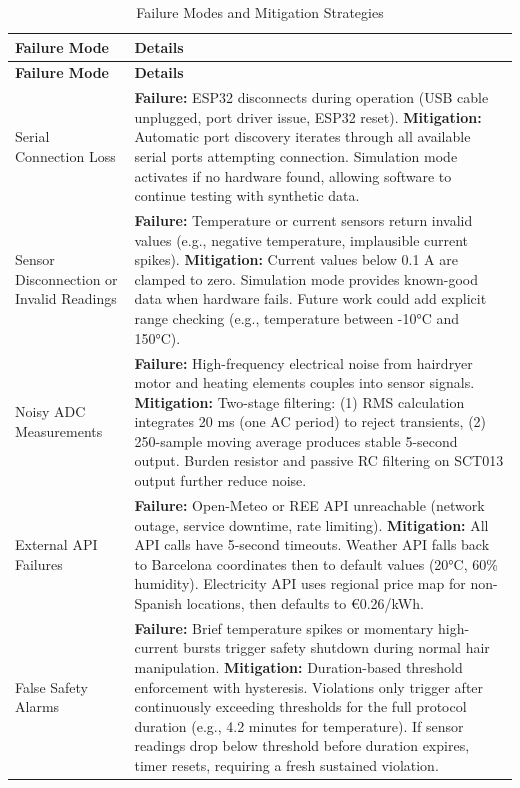 \documentclass[11pt,a4paper]{article}
\begin{document}
\begin{longtable}{|L{0.2\textwidth}|p{0.75\textwidth}|}
\caption{Failure Modes and Mitigation Strategies}
\label{tab:failure_modes} \\
\hline
\textbf{Failure Mode} & \textbf{Details} \\
\hline
\endfirsthead
\hline
\textbf{Failure Mode} & \textbf{Details} \\
\hline
\endhead
\hline
\endfoot
\hline
\endlastfoot
Serial Connection Loss & \textbf{Failure:} ESP32 disconnects during operation (USB cable unplugged, port driver issue, ESP32 reset). \newline \textbf{Mitigation:} Automatic port discovery iterates through all available serial ports attempting connection. Simulation mode activates if no hardware found, allowing software to continue testing with synthetic data. \\
\hline
Sensor Disconnection or Invalid Readings & \textbf{Failure:} Temperature or current sensors return invalid values (e.g., negative temperature, implausible current spikes). \newline \textbf{Mitigation:} Current values below 0.1 A are clamped to zero. Simulation mode provides known-good data when hardware fails. Future work could add explicit range checking (e.g., temperature between -10°C and 150°C). \\
\hline
Noisy ADC Measurements & \textbf{Failure:} High-frequency electrical noise from hairdryer motor and heating elements couples into sensor signals. \newline \textbf{Mitigation:} Two-stage filtering: (1) RMS calculation integrates 20 ms (one AC period) to reject transients, (2) 250-sample moving average produces stable 5-second output. Burden resistor and passive RC filtering on SCT013 output further reduce noise. \\
\hline
External API Failures & \textbf{Failure:} Open-Meteo or REE API unreachable (network outage, service downtime, rate limiting). \newline \textbf{Mitigation:} All API calls have 5-second timeouts. Weather API falls back to Barcelona coordinates then to default values (20°C, 60\% humidity). Electricity API uses regional price map for non-Spanish locations, then defaults to €0.26/kWh. \\
\hline
False Safety Alarms & \textbf{Failure:} Brief temperature spikes or momentary high-current bursts trigger safety shutdown during normal hair manipulation. \newline \textbf{Mitigation:} Duration-based threshold enforcement with hysteresis. Violations only trigger after continuously exceeding thresholds for the full protocol duration (e.g., 4.2 minutes for temperature). If sensor readings drop below threshold before duration expires, timer resets, requiring a fresh sustained violation. \\

\end{longtable}
\end{document}
